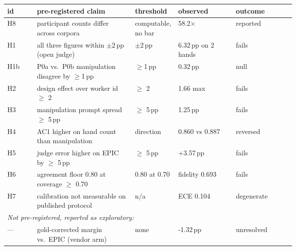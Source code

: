 \begin{tabular}{@{}lp{0.34\linewidth}p{0.15\linewidth}p{0.20\linewidth}l@{}}
\toprule
id & pre-registered claim & threshold & observed & outcome \\
\midrule
H8 & participant counts differ across corpora & computable, no bar & 58.2$\times$ & reported \\
H1 & all three figures within $\pm$2\,pp (open judge) & $\pm$2\,pp & 6.32\,pp on 2 hands & fails \\
H1b & P0a vs.\ P0b manipulation disagree by $\geq$1\,pp & $\geq$1\,pp & 0.32\,pp & null \\
H2 & design effect over worker id $\geq$ 2 & $\geq$ 2 & 1.66 max & fails \\
H3 & manipulation prompt spread $\geq$ 5\,pp & $\geq$ 5\,pp & 1.25\,pp & fails \\
H4 & AC1 higher on hand count than manipulation & direction & 0.860 vs 0.887 & reversed \\
H5 & judge error higher on EPIC by $\geq$ 5\,pp & $\geq$ 5\,pp & +3.57\,pp & fails \\
H6 & agreement floor 0.80 at coverage $\geq$ 0.70 & 0.80 at 0.70 & fidelity 0.693 & fails \\
H7 & calibration not measurable on published protocol & n/a & ECE 0.104 & degenerate \\
\midrule
\multicolumn{5}{l}{\emph{Not pre-registered, reported as exploratory:}} \\
--- & gold-corrected margin vs.\ EPIC (vendor arm) & none & -1.32\,pp & unresolved \\
\bottomrule
\end{tabular}
